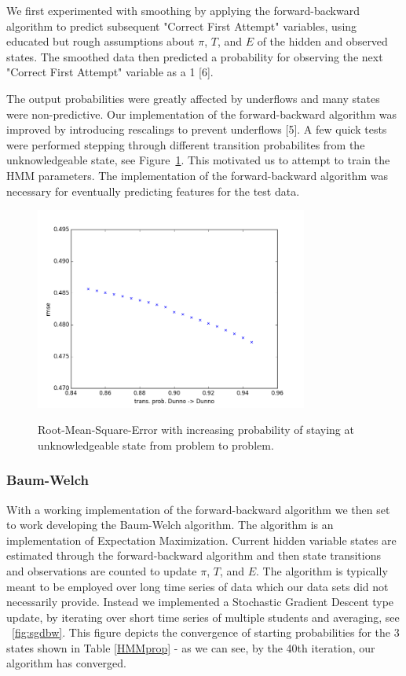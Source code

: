 \documentclass{article} %
\begin{document}
We first experimented with smoothing by applying the forward-backward algorithm to predict subsequent "Correct First Attempt" variables, using educated but rough assumptions about $\pi$, $T$, and $E$ of the hidden and observed states. The smoothed data then predicted a probability for observing the next "Correct First Attempt" variable as a 1 [6].

The output probabilities were greatly affected by underflows and many states were non-predictive. Our implementation of the forward-backward algorithm was improved by introducing rescalings to prevent underflows [5]. A few quick tests were performed stepping through different transition probabilites from the unknowledgeable state, see Figure~\ref{fig:dunno}. This motivated us to attempt to train the HMM parameters. The implementation of the forward-backward algorithm was necessary for eventually predicting features for the test data.

\begin{figure}[h]
\begin{center}
\includegraphics[width=0.8\textwidth]{dunno.png}
\label{fig:dunno}
\end{center}
\caption{Root-Mean-Square-Error with increasing probability of staying at unknowledgeable state from problem to problem.}
\end{figure}

\subsubsection{Baum-Welch}
With a working implementation of the forward-backward algorithm we then set to work developing the Baum-Welch algorithm. The algorithm is an implementation of Expectation Maximization. Current hidden variable states are estimated through the forward-backward algorithm and then state transitions and observations are counted to update $\pi$, $T$, and $E$. The algorithm is typically meant to be employed over long time series of data which our data sets did not necessarily provide. Instead we implemented a Stochastic Gradient Descent type update, by iterating over short time series of multiple students and averaging, see ~\ref{fig:sgdbw}. This figure depicts the convergence of starting probabilities for the 3 states shown in Table \ref{HMMprop} - as we can see, by the 40th iteration, our algorithm has converged.
\end{document}

